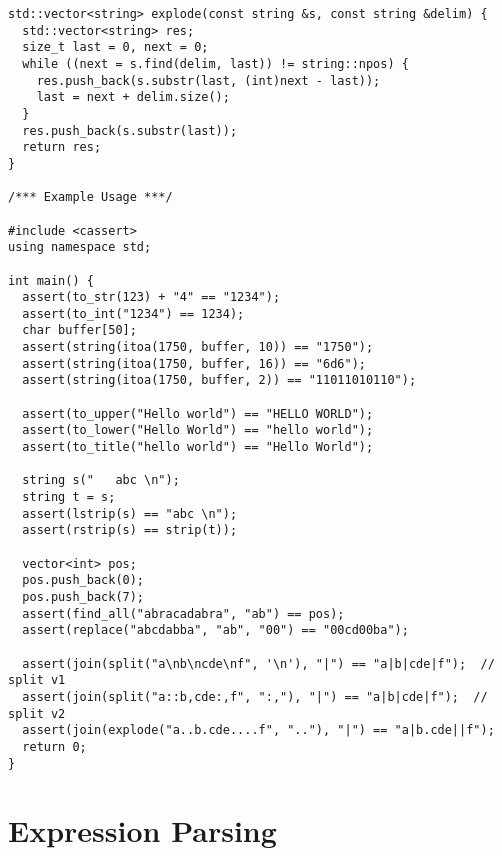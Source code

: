 \begin{lstlisting}
std::vector<string> explode(const string &s, const string &delim) {
  std::vector<string> res;
  size_t last = 0, next = 0;
  while ((next = s.find(delim, last)) != string::npos) {
    res.push_back(s.substr(last, (int)next - last));
    last = next + delim.size();
  }
  res.push_back(s.substr(last));
  return res;
}

/*** Example Usage ***/

#include <cassert>
using namespace std;

int main() {
  assert(to_str(123) + "4" == "1234");
  assert(to_int("1234") == 1234);
  char buffer[50];
  assert(string(itoa(1750, buffer, 10)) == "1750");
  assert(string(itoa(1750, buffer, 16)) == "6d6");
  assert(string(itoa(1750, buffer, 2)) == "11011010110");

  assert(to_upper("Hello world") == "HELLO WORLD");
  assert(to_lower("Hello World") == "hello world");
  assert(to_title("hello world") == "Hello World");

  string s("   abc \n");
  string t = s;
  assert(lstrip(s) == "abc \n");
  assert(rstrip(s) == strip(t));

  vector<int> pos;
  pos.push_back(0);
  pos.push_back(7);
  assert(find_all("abracadabra", "ab") == pos);
  assert(replace("abcdabba", "ab", "00") == "00cd00ba");

  assert(join(split("a\nb\ncde\nf", '\n'), "|") == "a|b|cde|f");  // split v1
  assert(join(split("a::b,cde:,f", ":,"), "|") == "a|b|cde|f");  // split v2
  assert(join(explode("a..b.cde....f", ".."), "|") == "a|b.cde||f");
  return 0;
}
\end{lstlisting}

\section{Expression Parsing}
\setcounter{section}{2}
\setcounter{subsection}{0}
